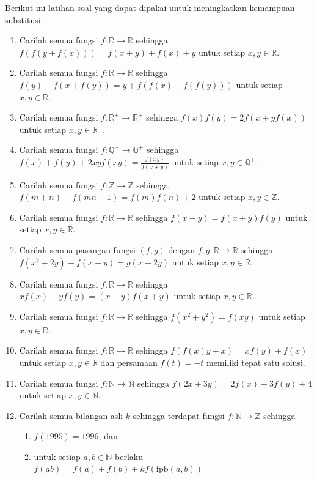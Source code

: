\documentclass{article}
\begin{document}
Berikut ini latihan soal yang dapat dipakai untuk meningkatkan kemampuan substitusi.
\begin{enumerate}
\item Carilah semua fungsi $f : \mathbb{R} \rightarrow \mathbb{R}$ sehingga $f(f(y+f(x))) = f(x+y) + f(x) + y$ untuk setiap $x, y \in \mathbb{R}$.
\item Carilah semua fungsi $f : \mathbb{R} \rightarrow \mathbb{R}$ sehingga $f(y) + f(x+f(y)) = y + f(f(x)+f(f(y)))$ untuk setiap $x, y \in \mathbb{R}$.
\item Carilah semua fungsi $f : \mathbb{R}^+ \rightarrow \mathbb{R}^+$ sehingga $f(x)f(y) = 2f(x+yf(x))$ untuk setiap $x, y \in \mathbb{R}^+$.
\item Carilah semua fungsi $f : \mathbb{Q}^+ \rightarrow \mathbb{Q}^+$ sehingga $f(x)+f(y)+2xy f(xy) = \frac{f(xy)}{f(x+y)}$ untuk setiap $x, y \in \mathbb{Q}^+$.
\item Carilah semua fungsi $f : \mathbb{Z} \rightarrow \mathbb{Z}$ sehingga $f(m+n)+f(mn-1) = f(m)f(n)+2$ untuk setiap $x, y \in \mathbb{Z}$.
\item Carilah semua fungsi $f : \mathbb{R} \rightarrow \mathbb{R}$ sehingga $f(x-y) = f(x+y)f(y)$ untuk setiap $x, y \in \mathbb{R}$.
\item Carilah semua pasangan fungsi $(f,g)$ dengan $f, g : \mathbb{R} \rightarrow \mathbb{R}$ sehingga $f(x^3+2y)+f(x+y) = g(x+2y)$ untuk setiap $x, y \in \mathbb{R}$.
\item Carilah semua fungsi $f : \mathbb{R} \rightarrow \mathbb{R}$ sehingga $x f(x) - y f(y) = (x-y) f(x+y)$ untuk setiap $x, y \in \mathbb{R}$.
\item Carilah semua fungsi $f : \mathbb{R} \rightarrow \mathbb{R}$ sehingga $f(x^2+y^2) = f(xy)$ untuk setiap $x, y \in \mathbb{R}$.
\end{enumerate}



\begin{enumerate}
\setcounter{enumi}{9}
\item Carilah semua fungsi $f : \mathbb{R} \rightarrow \mathbb{R}$ sehingga $f(f(x)y+x) = x f(y) + f(x)$ untuk setiap $x, y \in \mathbb{R}$ dan persamaan $f(t) = -t$ memiliki tepat satu solusi.
\item Carilah semua fungsi $f : \mathbb{N} \rightarrow \mathbb{N}$ sehingga $f(2x+3y) = 2f(x)+3f(y)+4$ untuk setiap $x, y \in \mathbb{N}$.
\item Carilah semua bilangan asli $k$ sehingga terdapat fungsi $f : \mathbb{N} \rightarrow \mathbb{Z}$ sehingga
\begin{enumerate}
\item $f(1995) = 1996$, dan
\item untuk setiap $a, b \in \mathbb{N}$ berlaku $f(ab) = f(a) + f(b) + k f(\text{fpb}(a,b))$
\end{enumerate}
\end{enumerate}
\end{document}

